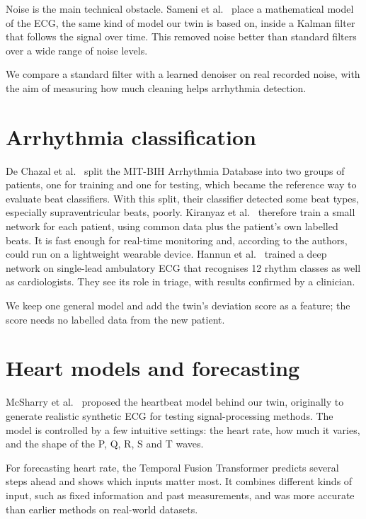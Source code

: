 Noise is the main technical obstacle. Sameni et al.~\cite{sameni2007nonlinear} place a mathematical model of the ECG, the same kind of model our twin is based on, inside a Kalman filter that follows the signal over time. This removed noise better than standard filters over a wide range of noise levels.

We compare a standard filter with a learned denoiser on real recorded noise, with the aim of measuring how much cleaning helps arrhythmia detection.

\section{Arrhythmia classification}
\label{sec:rw-classification}

De Chazal et al.~\cite{dechazal2004automatic} split the MIT-BIH Arrhythmia Database into two groups of patients, one for training and one for testing, which became the reference way to evaluate beat classifiers. With this split, their classifier detected some beat types, especially supraventricular beats, poorly. Kiranyaz et al.~\cite{kiranyaz2016realtime} therefore train a small network for each patient, using common data plus the patient's own labelled beats. It is fast enough for real-time monitoring and, according to the authors, could run on a lightweight wearable device. Hannun et al.~\cite{hannun2019cardiologist} trained a deep network on single-lead ambulatory ECG that recognises 12 rhythm classes as well as cardiologists. They see its role in triage, with results confirmed by a clinician.

We keep one general model and add the twin's deviation score as a feature; the score needs no labelled data from the new patient.

\section{Heart models and forecasting}
\label{sec:rw-models}

McSharry et al.~\cite{mcsharry2003dynamical} proposed the heartbeat model behind our twin, originally to generate realistic synthetic ECG for testing signal-processing methods. The model is controlled by a few intuitive settings: the heart rate, how much it varies, and the shape of the P, Q, R, S and T waves.

For forecasting heart rate, the Temporal Fusion Transformer \cite{lim2021temporal} predicts several steps ahead and shows which inputs matter most. It combines different kinds of input, such as fixed information and past measurements, and was more accurate than earlier methods on real-world datasets.

